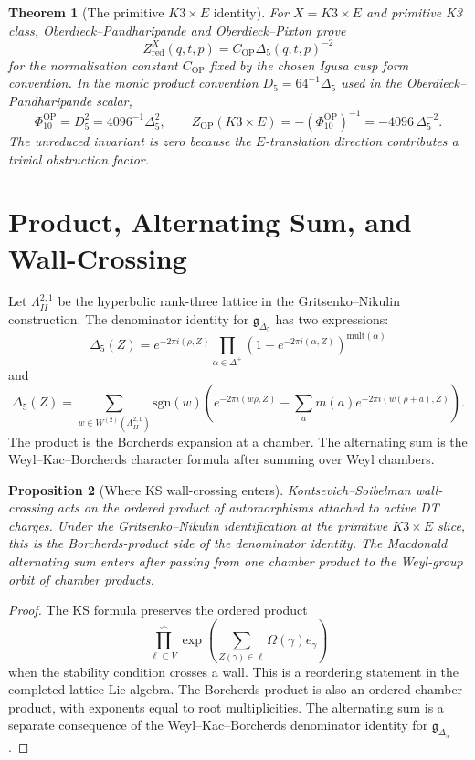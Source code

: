 \documentclass[11pt]{article}
\newtheorem{theorem}{Theorem}
\newtheorem{proposition}[theorem]{Proposition}
\theoremstyle{definition}
\providecommand{\sgn}{\mathrm{sgn}}
\providecommand{\fg}{\mathfrak{g}}
\begin{document}
\begin{theorem}[The primitive $K3\times E$ identity]
\label{thm:primitive-k3e-dt}
For $X=K3\times E$ and primitive K3 class, Oberdieck--Pandharipande
and Oberdieck--Pixton prove
\[
 Z^{X}_{\mathrm{red}}(q,t,p)
 = C_{\mathrm{OP}}\Delta_5(q,t,p)^{-2}
\]
for the normalisation constant $C_{\mathrm{OP}}$ fixed by the chosen
Igusa cusp form convention. In the monic product convention
$D_5=64^{-1}\Delta_5$ used in the Oberdieck--Pandharipande scalar,
\[
 \Phi_{10}^{\mathrm{OP}}=D_5^2=4096^{-1}\Delta_5^2,
 \qquad
 Z_{\mathrm{OP}}(K3\times E)=-(\Phi_{10}^{\mathrm{OP}})^{-1}
 =-4096\,\Delta_5^{-2}.
\]
The unreduced invariant is zero because the $E$-translation direction
contributes a trivial obstruction factor.
\end{theorem}

\section{Product, Alternating Sum, and Wall-Crossing}
\label{sec:product-sum-wall}

Let $\Lambda^{2,1}_{II}$ be the hyperbolic rank-three lattice in the
Gritsenko--Nikulin construction. The denominator identity for
$\fg_{\Delta_5}$ has two expressions:
\[
 \Delta_5(Z)
 = e^{-2\pi i(\rho,Z)}
 \prod_{\alpha\in\Delta^+}
 \left(1-e^{-2\pi i(\alpha,Z)}\right)^{\mathrm{mult}(\alpha)}
\]
and
\[
 \Delta_5(Z)
 = \sum_{w\in W^{(2)}(\Lambda^{2,1}_{II})}\sgn(w)
 \left(e^{-2\pi i(w\rho,Z)}
 -\sum_{a}m(a)e^{-2\pi i(w(\rho+a),Z)}\right).
\]
The product is the Borcherds expansion at a chamber. The alternating sum
is the Weyl--Kac--Borcherds character formula after summing over Weyl
chambers.

\begin{proposition}[Where KS wall-crossing enters]
\label{prop:ks-product-side}
Kontsevich--Soibelman wall-crossing acts on the ordered product of
automorphisms attached to active DT charges. Under the
Gritsenko--Nikulin identification at the primitive $K3\times E$ slice,
this is the Borcherds-product side of the denominator identity. The
Macdonald alternating sum enters after passing from one chamber product
to the Weyl-group orbit of chamber products.
\end{proposition}

\begin{proof}
The KS formula preserves the ordered product
\[
 \prod_{\ell\subset V}^{\curvearrowleft}
 \exp\!\left(\sum_{Z(\gamma)\in \ell}\Omega(\gamma)e_\gamma\right)
\]
when the stability condition crosses a wall. This is a reordering
statement in the completed lattice Lie algebra. The Borcherds product is
also an ordered chamber product, with exponents equal to root
multiplicities. The alternating sum is a separate consequence of the
Weyl--Kac--Borcherds denominator identity for $\fg_{\Delta_5}$.
\end{proof}
\end{document}
